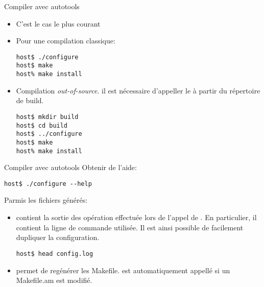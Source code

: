 \begin{frame}[fragile=singleslide]{Compiler avec autotools}
  \begin{itemize}
  \item C'est le cas le plus courant
  \item Pour une compilation classique:
\begin{lstlisting}
host$ ./configure
host$ make
host% make install
\end{lstlisting} %
  \item Compilation \emph{out-of-source}. il est nécessaire d'appeller
    le  à partir du répertoire de build.
\begin{lstlisting}
host$ mkdir build
host$ cd build
host$ ../configure
host$ make
host% make install
\end{lstlisting} %
  \end{itemize}
\end{frame}

\begin{frame}[fragile=singleslide]{Compiler avec autotools}
  Obtenir de l'aide:
\begin{lstlisting}
host$ ./configure --help
\end{lstlisting} %

  Parmis les fichiers générés:
  \begin{itemize}
  \item {}  contient la sortie  des opération effectuée
    lors de l'appel de .  En particulier, il contient
    la ligne de commande utilisée. Il est ainsi possible de facilement
    dupliquer la configuration.
\begin{lstlisting}
host$ head config.log
\end{lstlisting} %
  \item     {}     permet     de    regénérer     les
    Makefile.   est  automatiquement appellé  si un
    Makefile.am est modifié.
  \end{itemize}
\end{frame}



